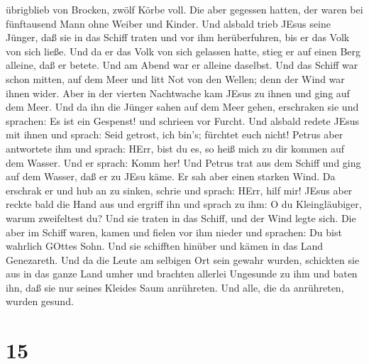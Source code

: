 übrigblieb von Brocken, zwölf Körbe voll.  Die aber
gegessen hatten, der waren bei fünftausend Mann ohne Weiber und Kinder.
 Und alsbald trieb JEsus seine Jünger, daß sie in das
Schiff traten und vor ihm herüberfuhren, bis er das Volk von sich ließe.
 Und da er das Volk von sich gelassen hatte, stieg er auf
einen Berg alleine, daß er betete. Und am Abend war er alleine daselbst.
 Und das Schiff war schon mitten, auf dem Meer und litt Not
von den Wellen; denn der Wind war ihnen wider.  Aber in der
vierten Nachtwache kam JEsus zu ihnen und ging auf dem Meer.
 Und da ihn die Jünger sahen auf dem Meer gehen, erschraken
sie und sprachen: Es ist ein Gespenst! und schrieen vor Furcht.
 Und alsbald redete JEsus mit ihnen und sprach: Seid
getrost, ich bin's; fürchtet euch nicht!  Petrus aber
antwortete ihm und sprach: HErr, bist du es, so heiß mich zu dir kommen
auf dem Wasser.  Und er sprach: Komm her! Und Petrus trat
aus dem Schiff und ging auf dem Wasser, daß er zu JEsu käme.
 Er sah aber einen starken Wind. Da erschrak er und hub an
zu sinken, schrie und sprach: HErr, hilf mir!  JEsus aber
reckte bald die Hand aus und ergriff ihn und sprach zu ihm: O du
Kleingläubiger, warum zweifeltest du?  Und sie traten in
das Schiff, und der Wind legte sich.  Die aber im Schiff
waren, kamen und fielen vor ihm nieder und sprachen: Du bist wahrlich
GOttes Sohn.  Und sie schifften hinüber und kämen in das
Land Genezareth.  Und da die Leute am selbigen Ort sein
gewahr wurden, schickten sie aus in das ganze Land umher und brachten
allerlei Ungesunde zu ihm  und baten ihn, daß sie nur
seines Kleides Saum anrühreten. Und alle, die da anrühreten, wurden
gesund.

\hypertarget{section-14}{%
\section{15}\label{section-14}}

